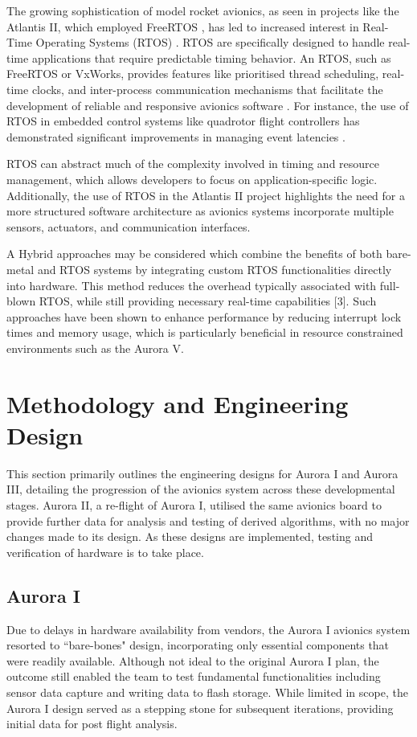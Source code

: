 The growing sophistication of model rocket avionics, as seen in projects like the Atlantis II, which employed FreeRTOS \cite{Atlantis2018}, has led to increased interest in Real-Time Operating Systems (RTOS) \cite{Di2018}. RTOS are specifically designed to handle real-time applications that require predictable timing behavior. An RTOS, such as FreeRTOS or VxWorks, provides features like prioritised thread scheduling, real-time clocks, and inter-process communication mechanisms that facilitate the development of reliable and responsive avionics software \cite{Dietrich2017}. For instance, the use of RTOS in embedded control systems like quadrotor flight controllers has demonstrated significant improvements in managing event latencies \cite{Di2018}. 

RTOS can abstract much of the complexity involved in timing and resource management, which allows developers to focus on application-specific logic. Additionally, the use of RTOS in the Atlantis II project highlights the need for a more structured software architecture as avionics systems incorporate multiple sensors, actuators, and communication interfaces.  

A Hybrid approaches may be considered which combine the benefits of both bare-metal and RTOS systems by integrating custom RTOS functionalities directly into hardware. This method reduces the overhead typically associated with full-blown RTOS, while still providing necessary real-time capabilities [3]. Such approaches have been shown to enhance performance by reducing interrupt lock times and memory usage, which is particularly beneficial in resource constrained environments such as the Aurora V.  

\section{Methodology and Engineering Design}
This section primarily outlines the engineering designs for Aurora I and Aurora III, detailing the progression of the avionics system across these developmental stages. Aurora II, a re-flight of Aurora I, utilised the same avionics board to provide further data for analysis and testing of derived algorithms, with no major changes made to its design. As these designs are implemented, testing and verification of hardware is to take place. 

\subsection{Aurora I }
Due to delays in hardware availability from vendors, the Aurora I avionics system resorted to “bare-bones" design, incorporating only essential components that were readily available. Although not ideal to the original Aurora I plan, the outcome still enabled the team to test fundamental functionalities including sensor data capture and writing data to flash storage. While limited in scope, the Aurora I design served as a stepping stone for subsequent iterations, providing initial data for post flight analysis. 

